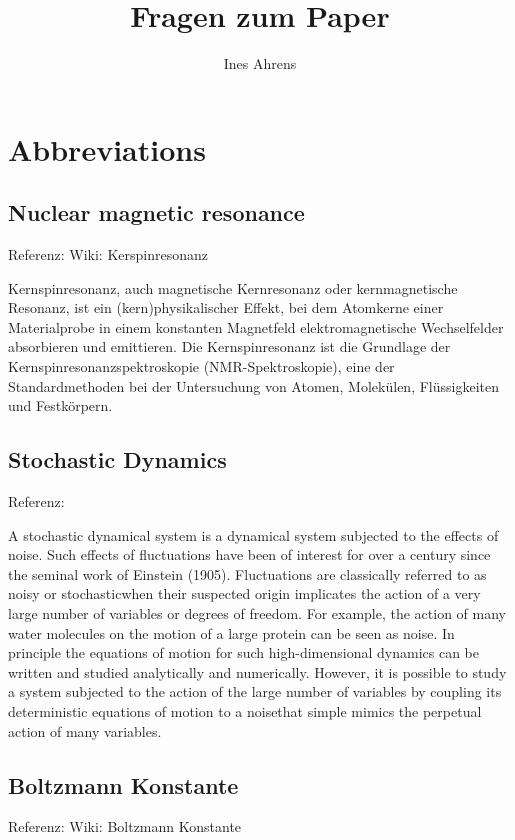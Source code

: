 \documentclass[]{article}
\title{Fragen zum Paper}
\author{Ines Ahrens}
\begin{document}
\maketitle

\section{Abbreviations}

\subsection[NMR]{Nuclear magnetic resonance}
Referenz: Wiki: Kerspinresonanz

Kernspinresonanz, auch magnetische Kernresonanz oder kernmagnetische Resonanz, ist ein (kern)physikalischer Effekt, bei dem Atomkerne einer Materialprobe in einem konstanten Magnetfeld elektromagnetische Wechselfelder absorbieren und emittieren. Die Kernspinresonanz ist die Grundlage der Kernspinresonanzspektroskopie (NMR-Spektroskopie), eine der Standardmethoden bei der Untersuchung von Atomen, Molekülen, Flüssigkeiten und Festkörpern. 

\subsection*{Stochastic Dynamics}
Referenz: %

A stochastic dynamical system is a dynamical system subjected to the effects of noise. Such effects of fluctuations have been of interest for over a century since the seminal work of Einstein (1905). Fluctuations are classically referred to as \glqq noisy \grqq or \glqq stochastic\grqq  when their suspected origin implicates the action of a very large number of variables or \glqq degrees of freedom\grqq. For example, the action of many water molecules on the motion of a large protein can be seen as noise. In principle the equations of motion for such high-dimensional dynamics can be written and studied analytically and numerically. However, it is possible to study a system subjected to the action of the large number of variables by coupling its deterministic equations of motion to a \glqq noise\grqq  that simple mimics the perpetual action of many variables. 

\subsection{Boltzmann Konstante}
Referenz: Wiki: Boltzmann Konstante
\end{document}
